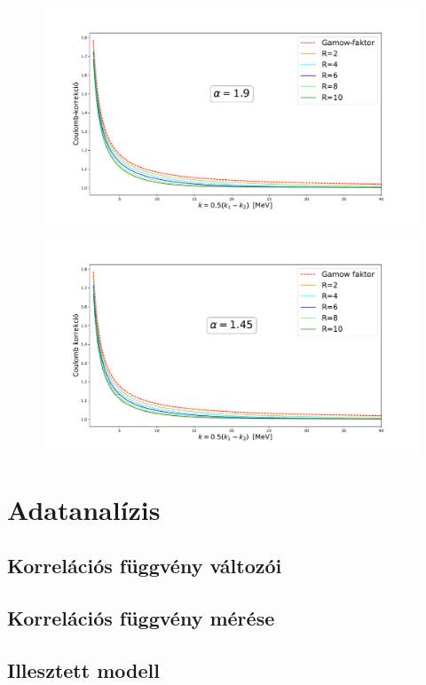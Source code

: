 \documentclass[10pt,a4paper]{article}
\numberwithin{equation}{subsection}
\numberwithin{figure}{section}
\begin{document}
\begin{figure}[H]
\centering
\includegraphics[scale=0.45]{pic/Coulomb/C2_dR_a19_S2correct.pdf}
\end{figure}
\begin{figure}[H]
\centering
\includegraphics[scale=0.45]{pic/Coulomb/C2_dR_a14_S2correct.pdf}
\end{figure}

\section{Adatanalízis}
\subsection{Korrelációs függvény változói}
\subsection{Korrelációs függvény mérése}
\subsection{Illesztett modell}
\end{document}
